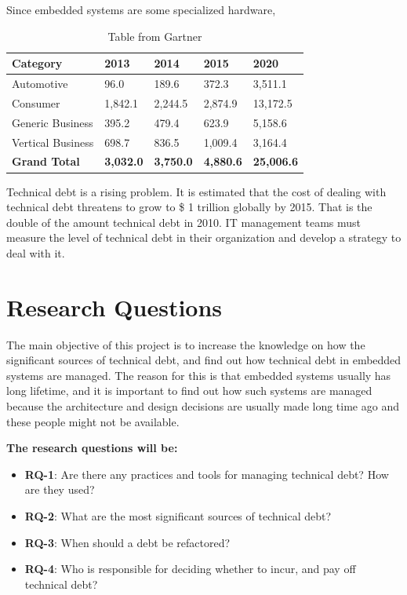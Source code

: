 Since embedded systems are some specialized hardware,

\begin{table}
	\centering
	\begin{tabular}{ | l | l | l | l | l |}
	\hline
	\textbf{Category} & \textbf{2013} & \textbf{2014} & \textbf{2015} & \textbf{2020} \\ \hline
	Automotive & 96.0 & 189.6 & 372.3 & 3,511.1 \\ \hline
	Consumer & 1,842.1 & 2,244.5 & 2,874.9 & 13,172.5 \\ \hline
	Generic Business & 395.2 & 479.4 & 623.9 & 5,158.6 \\ \hline
	Vertical Business & 698.7 & 836.5 & 1,009.4 & 3,164.4 \\ \hline
	\textbf{Grand Total} & \textbf{3,032.0} & \textbf{3,750.0} & \textbf{4,880.6} & \textbf{25,006.6} \\
	\hline
	\end{tabular}
	\caption{Table from Gartner\cite{gartner}} \label{tab:table1}
\end{table}

Technical debt is a rising problem. It is estimated that the cost of dealing with technical debt threatens to grow to \$ 1 trillion globally by 2015\cite{gartner2010}. That is the double of the amount technical debt in 2010. IT management teams must measure the level of technical debt in their organization and develop a strategy to deal with it.


\section{Research Questions}
The main objective of this project is to increase the knowledge on how the significant sources of technical debt, and find out how technical debt in embedded systems are managed. The reason for this is that embedded systems usually has long lifetime, and it is important to find out how such systems are managed because the architecture and design decisions are usually made long time ago and these people might not be available. 

\textbf{The research questions will be:} 
\begin{itemize}
	\item \textbf{RQ-1}: Are there any practices and tools for managing technical debt? How are they used?
	\item \textbf{RQ-2}: What are the most significant sources of technical debt?
	\item \textbf{RQ-3}: When should a debt be refactored?
	\item \textbf{RQ-4}: Who is responsible for deciding whether to incur, and pay off technical debt?
\end{itemize}

